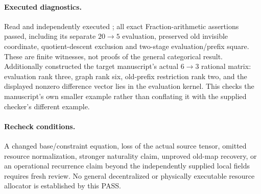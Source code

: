 \documentclass{article}
\begin{document}
\paragraph{Executed diagnostics.}
Read and independently executed ; all exact Fraction-arithmetic assertions passed, including its separate $20\to5$ evaluation, preserved old invisible coordinate, quotient-descent exclusion and two-stage evaluation/prefix square. These are finite witnesses, not proofs of the general categorical result. Additionally constructed the target manuscript's actual $6\to3$ rational matrix: evaluation rank three, graph rank six, old-prefix restriction rank two, and the displayed nonzero difference vector lies in the evaluation kernel. This checks the manuscript's own smaller example rather than conflating it with the supplied checker's different example.

\paragraph{Recheck conditions.}
A changed base/constraint equation, loss of the actual source tensor, omitted resource normalization, stronger naturality claim, unproved old-map recovery, or an operational recurrence claim beyond the independently supplied local fields requires fresh review. No general decentralized or physically executable resource allocator is established by this PASS.
\end{document}
